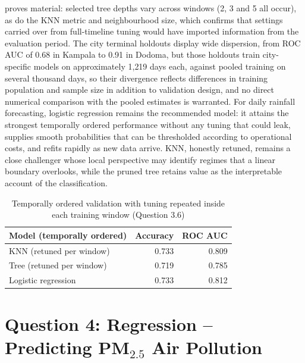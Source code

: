 \documentclass[conference]{IEEEtran}
\begin{document}
\begin{enumerate}
proves material: selected tree depths vary across windows (2, 3 and 5 all occur), as do the KNN metric and neighbourhood size, which confirms that settings carried over from full-timeline tuning would have imported information from the evaluation period. The city terminal holdouts display wide dispersion, from ROC AUC of 0.68 in Kampala to 0.91 in Dodoma, but those holdouts train city-specific models on approximately 1{,}219 days each, against pooled training on several thousand days, so their divergence reflects differences in training population and sample size in addition to validation design, and no direct numerical comparison with the pooled estimates is warranted. For daily rainfall forecasting, logistic regression remains the recommended model: it attains the strongest temporally ordered performance without any tuning that could leak, supplies smooth probabilities that can be thresholded according to operational costs, and refits rapidly as new data arrive. KNN, honestly retuned, remains a close challenger whose local perspective may identify regimes that a linear boundary overlooks, while the pruned tree retains value as the interpretable account of the classification.

    \begin{table}[h!]
        \centering
        \footnotesize
        \begin{tabular}{lrr}
            \toprule
            Model (temporally ordered) & Accuracy & ROC AUC \\
            \midrule
            KNN (retuned per window) & 0.733 & 0.809 \\
            Tree (retuned per window) & 0.719 & 0.785 \\
            Logistic regression & 0.733 & 0.812 \\
            \bottomrule
        \end{tabular}
        \caption{Temporally ordered validation with tuning repeated inside each training window (Question 3.6)}
        \label{tab:temporal}
    \end{table}
\end{enumerate}

\section{Question 4: Regression -- Predicting PM$_{2.5}$ Air Pollution}
\end{document}

